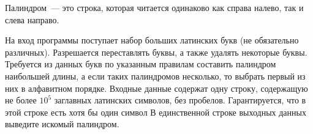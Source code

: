 Палиндром~--- это строка, которая читается одинаково как справа налево, так и слева направо.

На вход программы поступает набор больших латинских букв (не обязательно различных). Разрешается переставлять буквы,
 а также удалять некоторые буквы. Требуется из данных букв по указанным правилам составить палиндром наибольшей длины,
 а если таких палиндромов несколько, то выбрать первый из них в алфавитном порядке.
\InputFile
Входные данные содержат одну строку, содержащую не более $10^5$ заглавных латинских символов, без пробелов. 
Гарантируется, что в этой строке есть хотя бы один символ
\OutputFile
В единственной строке выходных данных выведите искомый палиндром.

